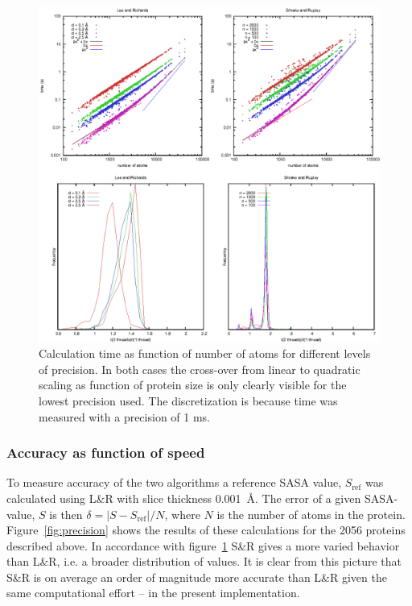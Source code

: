 \documentclass[a4paper,11pt]{article}
\begin{document}
\begin{figure}
  \includegraphics{../analysis/plots/time}
  \caption{Calculation time as function of number of atoms for
    different levels of precision. In both cases the cross-over from
    linear to quadratic scaling as function of protein size is only
    clearly visible for the lowest precision used. The discretization
    is because time was measured with a precision of 1
    ms.\label{fig:time}}
\end{figure}

\subsubsection{Accuracy as function of speed}\label{sec:accuracy}

To measure accuracy of the two algorithms a reference SASA value,
$S_\text{ref}$ was calculated using L\&R with slice thickness
0.001~Å. The error of a given SASA-value, $S$ is then $\delta = \lvert
S - S_\text{ref} \rvert / N$, where $N$ is the number of atoms in the
protein. Figure~\ref{fig:precision} shows the results of these
calculations for the 2056 proteins described above. In accordance with
figure~\ref{fig:time} S\&R gives a more varied behavior than L\&R,
i.e. a broader distribution of values. It is clear from this picture
that S\&R is on average an order of magnitude more accurate than L\&R
given the same computational effort -- in the present implementation.
\end{document}
